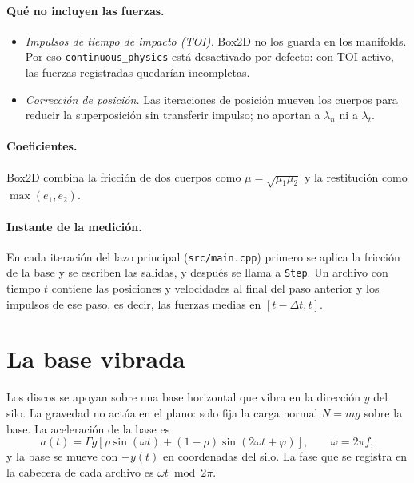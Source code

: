 \documentclass[11pt,a4paper]{article}
\newcommand{\code}[1]{\texttt{#1}}
\begin{document}
\paragraph{Qué no incluyen las fuerzas.}
\begin{itemize}
  \item \emph{Impulsos de tiempo de impacto (TOI).} Box2D no los guarda en
    los manifolds. Por eso \code{continuous\_physics} está desactivado por
    defecto: con TOI activo, las fuerzas registradas quedarían incompletas.
  \item \emph{Corrección de posición.} Las iteraciones de posición mueven
    los cuerpos para reducir la superposición sin transferir impulso; no
    aportan a $\lambda_n$ ni a $\lambda_t$.
\end{itemize}

\paragraph{Coeficientes.} Box2D combina la fricción de dos cuerpos como
$\mu = \sqrt{\mu_1 \mu_2}$ y la restitución como $\max(e_1, e_2)$.

\paragraph{Instante de la medición.} En cada iteración del lazo principal
(\code{src/main.cpp}) primero se aplica la fricción de la base y se
escriben las salidas, y después se llama a \code{Step}. Un archivo con
tiempo $t$ contiene las posiciones y velocidades al final del paso
anterior y los impulsos de ese paso, es decir, las fuerzas medias en
$[t - \Delta t, t]$.

\section{La base vibrada}
\label{sec:base}

Los discos se apoyan sobre una base horizontal que vibra en la dirección
$y$ del silo. La gravedad no actúa en el plano: solo fija la carga normal
$N = mg$ sobre la base. La aceleración de la base es
\begin{equation}
  a(t) = \Gamma g \left[ \rho \sin(\omega t) + (1-\rho) \sin(2 \omega t +
  \varphi) \right], \qquad \omega = 2 \pi f ,
\end{equation}
y la base se mueve con $-y(t)$ en coordenadas del silo. La fase que se
registra en la cabecera de cada archivo es $\omega t \bmod 2\pi$.
\end{document}
